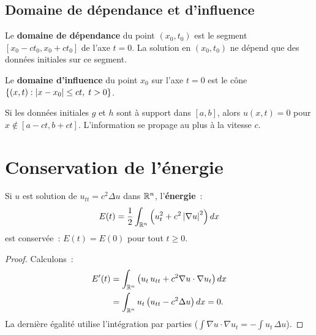\subsection{Domaine de d\'ependance et d'influence}

\begin{definition}
Le \textbf{domaine de d\'ependance} du point $(x_0, t_0)$ est le segment
$[x_0 - ct_0, x_0 + ct_0]$ de l'axe $t = 0$. La solution en $(x_0, t_0)$
ne d\'epend que des donn\'ees initiales sur ce segment.
\end{definition}

\begin{definition}
Le \textbf{domaine d'influence} du point $x_0$ sur l'axe $t = 0$ est
le c\^one $\{(x,t) : \left| x - x_0 \right| \leq ct,\; t > 0\}$.
\end{definition}

\begin{theoreme}
Si les donn\'ees initiales $g$ et $h$ sont \`a support dans $[a,b]$,
alors $u(x,t) = 0$ pour $x \notin [a-ct, b+ct]$. L'information se
propage au plus \`a la vitesse $c$.
\end{theoreme}

\section{Conservation de l'\'energie}

\begin{theoreme}
Si $u$ est solution de $u_{tt} = c^2\Delta u$ dans $\mathbb{R}^n$, l'\textbf{\'energie}~:
\begin{equation}\label{eq:energie_ondes}
    E(t) = \frac{1}{2}\int_{\mathbb{R}^n}
    \left(u_t^2 + c^2\left| \nabla u \right|^2\right) dx
\end{equation}
est conserv\'ee~: $E(t) = E(0)$ pour tout $t \geq 0$.
\end{theoreme}

\begin{proof}
Calculons~:
\begin{align*}
    E'(t) &= \int_{\mathbb{R}^n} \left(u_t\, u_{tt} + c^2 \nabla u \cdot \nabla u_t\right) dx \\
    &= \int_{\mathbb{R}^n} u_t \left(u_{tt} - c^2\Delta u\right) dx = 0.
\end{align*}
La derni\`ere \'egalit\'e utilise l'int\'egration par parties
($\int \nabla u \cdot \nabla u_t = -\int u_t\, \Delta u$).
\end{proof}

